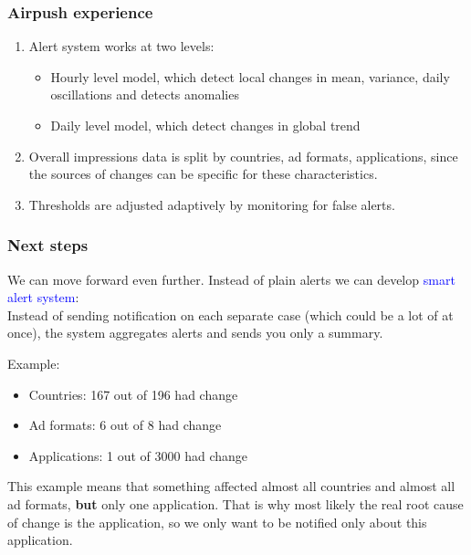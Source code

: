 \documentclass[intlimits, 9pt, unicode]{beamer}
\newcommand{\textblue}[1]{\textcolor{blue}{#1}}
\begin{document}
\begin{frame}
    \frametitle{Airpush experience}

\begin{enumerate}
  \item Alert system works at two levels:
 \begin{itemize}
	    \item Hourly level model, which detect local changes in mean, variance, daily oscillations and detects anomalies
\smallskip
		\item Daily level model, which detect changes in global trend
\end{itemize}
\bigskip
\item
Overall impressions data is split by countries, ad formats, applications,
since the sources of changes can be specific for these characteristics.
\bigskip
\item
Thresholds are adjusted adaptively by monitoring for false alerts.
\end{enumerate}

\end{frame}

\begin{frame}
    \frametitle{Next steps}

We can move forward even further.
Instead of plain alerts we can develop \textblue{smart alert system}:\\

Instead of sending notification on each separate case (which could be a lot of at once), the system aggregates alerts and sends you only a summary.

\bigskip
Example:

\medskip
 \begin{itemize}
	    \item Countries: 167 out of 196 had change
		\item Ad formats: 6 out of 8 had change
		\item Applications: 1 out of 3000 had change
\end{itemize}

\medskip
 This example means that something affected almost all countries and almost all ad formats, \textbf{but} only one application. That is why most likely the real root cause of change is the application, so we only want to be notified only about this application.

\end{frame}
\end{document}

